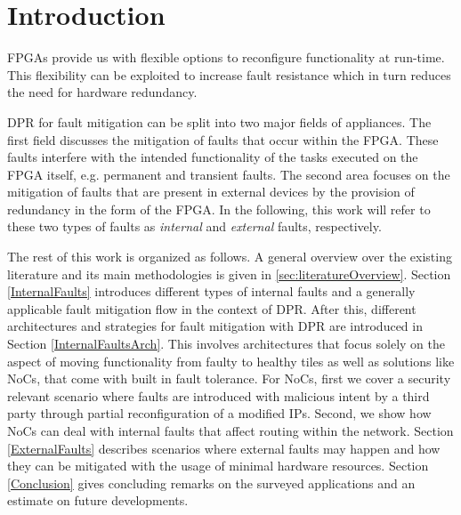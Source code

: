 
\section{Introduction}\label{Introduction}
\glspl{FPGA} provide us with flexible options to reconfigure functionality at run-time. 
This flexibility can be exploited to increase fault resistance which in turn reduces the need for hardware redundancy. 

\gls{DPR} for fault mitigation can be split into two major fields of appliances. 
The first field discusses the mitigation of faults that occur within the \gls{FPGA}.
These faults interfere with the intended functionality of the tasks executed on the \gls{FPGA} itself, e.g. permanent and transient faults. 
The second area focuses on the mitigation of faults that are present in external devices by the provision of redundancy in the form of the \gls{FPGA}.
In the following, this work will refer to these two types of faults as \textit{internal} and \textit{external} faults, respectively.

The rest of this work is organized as follows.
A general overview over the existing literature and its main methodologies is given in \ref{sec:literatureOverview}.
Section \ref{InternalFaults} introduces different types of internal faults and a generally applicable fault mitigation flow in the context of \gls{DPR}.
After this, different architectures and strategies for fault mitigation with \gls{DPR} are introduced in Section \ref{InternalFaultsArch}.
This involves architectures that focus solely on the aspect of moving functionality from faulty to healthy tiles as well as solutions like \glspl{NoC}, that come with built in fault tolerance. 
For \glspl{NoC}, first we cover a security relevant scenario where faults are introduced with malicious intent by a third party through partial reconfiguration of a modified \glspl{IP}.
Second, we show how \glspl{NoC} can deal with internal faults that affect routing within the network.  
Section \ref{ExternalFaults} describes scenarios where external faults may happen and how they can be mitigated with the usage of minimal hardware resources. 
Section \ref{Conclusion} gives concluding remarks on the surveyed applications and an estimate on future developments.

